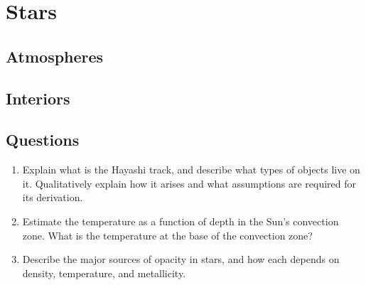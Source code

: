 \section{Stars}
\subsection{Atmospheres}
\subsection{Interiors}
\subsection{Questions}
\begin{enumerate}
\item Explain what is the Hayashi track, and describe what types of objects live on it.
      Qualitatively explain how it arises and what assumptions are required for its derivation.
\item Estimate the temperature as a function of depth in the Sun's convection zone. What
      is the temperature at the base of the convection zone?
\item Describe the major sources of opacity in stars, and how each depends on density,
      temperature, and metallicity.
\end{enumerate}
